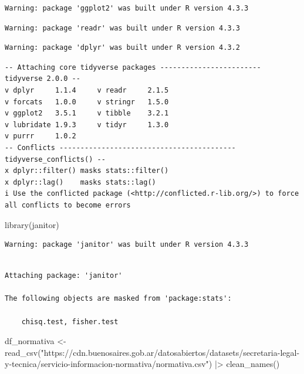 \documentclass[
  letterpaper,
  DIV=11,
  numbers=noendperiod]{scrreprt}
\newenvironment{Shaded}{\begin{snugshade}}{\end{snugshade}}
\newcommand{\FunctionTok}[1]{\textcolor[rgb]{0.28,0.35,0.67}{#1}}
\newcommand{\NormalTok}[1]{\textcolor[rgb]{0.00,0.23,0.31}{#1}}
\newcommand{\OtherTok}[1]{\textcolor[rgb]{0.00,0.23,0.31}{#1}}
\newcommand{\SpecialCharTok}[1]{\textcolor[rgb]{0.37,0.37,0.37}{#1}}
\newcommand{\StringTok}[1]{\textcolor[rgb]{0.13,0.47,0.30}{#1}}
\begin{document}
\begin{verbatim}
Warning: package 'ggplot2' was built under R version 4.3.3
\end{verbatim}

\begin{verbatim}
Warning: package 'readr' was built under R version 4.3.3
\end{verbatim}

\begin{verbatim}
Warning: package 'dplyr' was built under R version 4.3.2
\end{verbatim}

\begin{verbatim}
-- Attaching core tidyverse packages ------------------------ tidyverse 2.0.0 --
v dplyr     1.1.4     v readr     2.1.5
v forcats   1.0.0     v stringr   1.5.0
v ggplot2   3.5.1     v tibble    3.2.1
v lubridate 1.9.3     v tidyr     1.3.0
v purrr     1.0.2     
-- Conflicts ------------------------------------------ tidyverse_conflicts() --
x dplyr::filter() masks stats::filter()
x dplyr::lag()    masks stats::lag()
i Use the conflicted package (<http://conflicted.r-lib.org/>) to force all conflicts to become errors
\end{verbatim}

\begin{Shaded}
\begin{Highlighting}[]
\FunctionTok{library}\NormalTok{(janitor)}
\end{Highlighting}
\end{Shaded}

\begin{verbatim}
Warning: package 'janitor' was built under R version 4.3.3
\end{verbatim}

\begin{verbatim}

Attaching package: 'janitor'

The following objects are masked from 'package:stats':

    chisq.test, fisher.test
\end{verbatim}

\begin{Shaded}
\begin{Highlighting}[]
\NormalTok{df\_normativa }\OtherTok{\textless{}{-}} \FunctionTok{read\_csv}\NormalTok{(}\StringTok{"https://cdn.buenosaires.gob.ar/datosabiertos/datasets/secretaria{-}legal{-}y{-}tecnica/servicio{-}informacion{-}normativa/normativa.csv"}\NormalTok{) }\SpecialCharTok{|\textgreater{}} 
  \FunctionTok{clean\_names}\NormalTok{()}
\end{Highlighting}
\end{Shaded}
\end{document}

